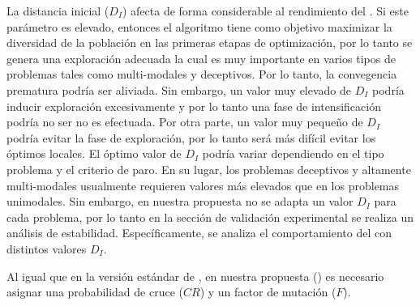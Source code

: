 La distancia inicial ($D_I$) afecta de forma considerable al rendimiento del \DEEDM{}.
%
Si este parámetro es elevado, entonces el algoritmo tiene como objetivo maximizar la diversidad de la población en las primeras etapas de optimización, por lo tanto se genera una exploración adecuada la cual es muy importante en varios tipos de problemas tales como multi-modales y deceptivos.
%
Por lo tanto, la convegencia prematura podría ser aliviada.
%
Sin embargo, un valor muy elevado de $D_I$ podría inducir exploración excesivamente y por lo tanto una fase de intensificación podría no ser no es efectuada.
%
Por otra parte, un valor muy pequeño de $D_I$ podría evitar la fase de exploración, por lo tanto será más difícil evitar los óptimos locales.
%
El óptimo valor de $D_I$ podría variar dependiendo en el tipo problema y el criterio de paro.
%
En su lugar, los problemas deceptivos y altamente multi-modales usualmente requieren valores más elevados que en los problemas unimodales.
%
Sin embargo, en nuestra propuesta no se adapta un valor $D_I$ para cada problema, por lo tanto en la sección de validación experimental se realiza un análisis de estabilidad.
%
Específicamente, se analiza el comportamiento del \DEEDM{} con distintos valores $D_I$.
%

%
Al igual que en la versión estándar de \DE{}, en nuestra propuesta (\DEEDM{}) es necesario asignar una probabilidad de cruce ($CR$) y un factor de mutación ($F$).


